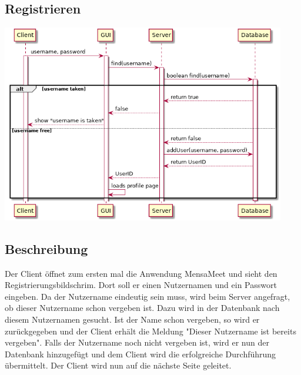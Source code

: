 \documentclass[a4paper]{scrreprt}
\begin{document}
\subsection{Registrieren}
\begin{center}
	\includegraphics[width=0.93\textwidth]{Sequenzdiagramme/Registration.png}
\end{center}
\subsection*{Beschreibung}
Der Client öffnet zum ersten mal die Anwendung MensaMeet und sieht den Registrierungsbildschrim. Dort soll er einen Nutzernamen und ein Passwort eingeben. Da der Nutzername eindeutig sein muss, wird beim Server angefragt, ob dieser Nutzername schon vergeben ist. Dazu wird in der Datenbank nach diesem Nutzernamen gesucht. Ist der Name schon vergeben, so wird er zurückgegeben und der Client erhält die Meldung "Dieser Nutzername ist bereits vergeben".
Falls der Nutzername noch nicht vergeben ist, wird er nun der Datenbank hinzugefügt und dem Client wird die erfolgreiche Durchführung übermittelt. Der Client wird nun auf die nächste Seite geleitet.
\newpage
\end{document}
